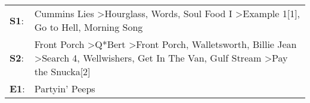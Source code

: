 \begin{supertabular}{p{0.03\textwidth}p{0.92\textwidth}}
 \textbf{S1}:  &                                                                                                                                                          Cummins Lies\textsuperscript{} \textgreater \enspace Hourglass\textsuperscript{}, \enspace Words\textsuperscript{}, \enspace Soul Food I\textsuperscript{} \textgreater \enspace Example 1[1]\textsuperscript{}, \enspace Go to Hell\textsuperscript{}, \enspace Morning Song\textsuperscript{}  \enspace  \\
 \textbf{S2}:  &  Front Porch\textsuperscript{} \textgreater \enspace Q*Bert\textsuperscript{} \textgreater \enspace Front Porch\textsuperscript{}, \enspace Walletsworth\textsuperscript{}, \enspace Billie Jean\textsuperscript{} \textgreater \enspace Search 4\textsuperscript{}, \enspace Wellwishers\textsuperscript{}, \enspace Get In The Van\textsuperscript{}, \enspace Gulf Stream\textsuperscript{} \textgreater \enspace Pay the Snucka[2]\textsuperscript{}  \enspace  \\
 \textbf{E1}:  &                                                                                                                                                                                                                                                                                                                                                                                                                         Partyin' Peeps\textsuperscript{}  \enspace  \\
\end{supertabular}
